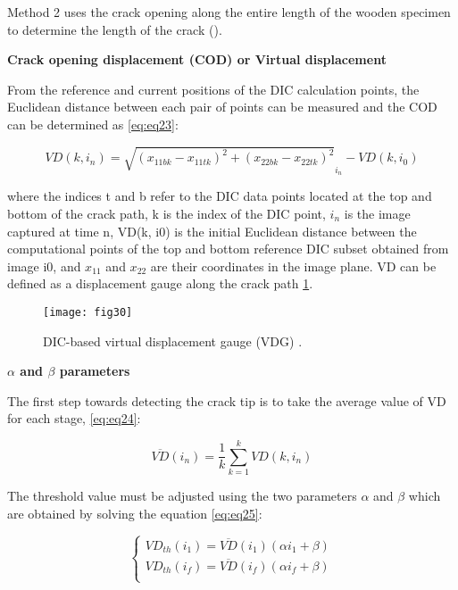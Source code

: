 Method 2 uses the crack opening along the entire length of the wooden specimen to determine the length of the crack (\citep{FilhoJ2022}). 

\textbf{Crack opening displacement (COD) or Virtual displacement}

From the reference and current positions of the DIC calculation points, the Euclidean distance between each pair of points can be measured and the COD can be determined as \ref{eq:eq23}:

\begin{equation}
	VD(k,i_n)=\sqrt{(x_{11bk}-x_{11tk})^2 + (x_{22bk}-x_{22tk})^2}_{i_n} - VD(k,i_0)
	\label{eq:eq23}
\end{equation}

where the indices t and b refer to the DIC data points located at the top and bottom of the crack path, k is the index of the DIC point, $i_n$ is the image captured at time n, VD(k, i0) is the initial Euclidean distance between the computational points of the top and bottom reference DIC subset obtained from image i0, and $x_{11}$ and $x_{22}$ are their coordinates in the image plane. VD can be defined as a displacement gauge along the crack path \ref{fig:fig30}.

\begin{figure}[htp]
	\centering
	\texttt{[image: fig30]}
	\caption{DIC-based virtual displacement gauge (VDG) \citep{FilhoJ2022}.}
	\label{fig:fig30}
\end{figure}

\textbf{$\alpha$ and $\beta$ parameters}

The first step towards detecting the crack tip is to take the average value of VD for each stage, \ref{eq:eq24}:

\begin{equation}
	\overline{VD}(i_n)=\frac{1}{k} \sum_{k=1}^{k}VD(k,i_n)
	\label{eq:eq24}
\end{equation}

The threshold value must be adjusted using the two parameters $\alpha$ and $\beta$ which are obtained by solving the equation \ref{eq:eq25}:

\begin{equation}
	\begin{cases}
		VD_{th}(i_1)=\overline{VD}(i_1)(\alpha i_1 +\beta)\\
		VD_{th}(i_f)=\overline{VD}(i_f)(\alpha i_f +\beta)\\ 
	\end{cases}
\label{eq:eq25}
\end{equation}

